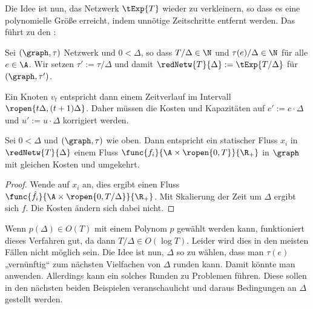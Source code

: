 Die Idee ist nun, das Netzwerk $\tExp{T}$ wieder zu verkleinern, so dass es
eine polynomielle Größe erreicht, indem unnötige Zeitschritte entfernt werden.
Das führt zu den :

\begin{definition}\label{def:red_network}
    Sei $(\graph, \tau)$ Netzwerk und $0 < \Delta$, so dass $T/\Delta \in \N$
    und $\tau(e)/\Delta \in \N$ für alle $e \in \A$. Wir setzen
    $\tau' := \tau/\Delta$ und damit
    $\redNetw{T}{\Delta} := \tExp{T/\Delta}$ für $(\graph, \tau')$.
    
    Ein Knoten $v_t$ entspricht dann einem Zeitverlauf im Intervall
    $\ropen{t \Delta, (t+1) \Delta}$. Daher müssen die Kosten und Kapazitäten
    auf $c' := c \cdot \Delta$ und $u' := u \cdot \Delta$ korrigiert werden.
\end{definition}

\begin{lemma}\label{lem:reduced_static_dyn_conv}
    Sei $0 < \Delta$ und $(\graph, \tau)$ wie oben. Dann entspricht ein statischer
    Fluss $x_i$ in $\redNetw{T}{\Delta}$ einem Fluss
    $\func{f_i}{\A \times \ropen{0, T}}{\R_+}$ in $\graph$ mit gleichen Kosten
    und umgekehrt.
    
    \begin{proof}
        Wende  auf $x_i$ an, dies ergibt einen Fluss
        $\func{\hat{f}_i}{\A \times \ropen{0, T/\Delta}}{\R_+}$. Mit Skalierung der
        Zeit um $\Delta$ ergibt sich $f$. Die Kosten ändern sich dabei nicht.
    \end{proof}
\end{lemma}

Wenn $p(\Delta) \in O(T)$ mit einem Polynom $p$ gewählt werden kann, funktioniert
dieses Verfahren gut, da dann $T/\Delta \in O(\log T)$. Leider wird dies in den meisten
Fällen nicht möglich sein.
Die Idee ist nun, $\Delta$ so zu wählen, dass man $\tau(e)$ „vernünftig“ zum
nächsten Vielfachen von $\Delta$ runden kann. Damit könnte man
 anwenden. Allerdings kann ein solches
Runden zu Problemen führen. Diese sollen in den nächsten beiden Beispielen
veranschaulicht und daraus Bedingungen an $\Delta$ gestellt werden.

